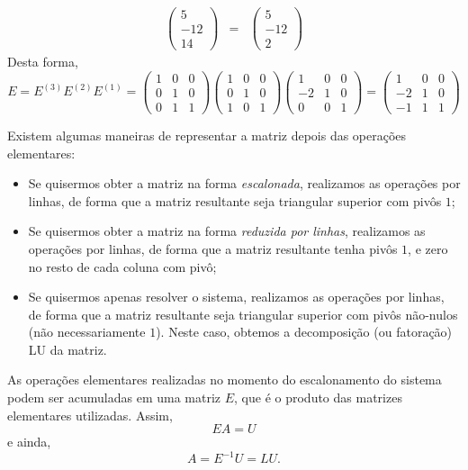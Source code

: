\begin{exemplo*}
\begin{eqnarray*}
		\begin{pmatrix}
			5\\-12\\14
		\end{pmatrix}
		&=&
		\begin{pmatrix}
			5\\-12\\2
		\end{pmatrix}
	\end{eqnarray*}
	Desta forma, 
	\begin{equation*}
	E = E^{(3)}E^{(2)}E^{(1)} = 
	\begin{pmatrix}
		1&0&0\\0&1&0\\0&1&1
	\end{pmatrix}
	\begin{pmatrix}
		1&0&0\\0&1&0\\1&0&1
	\end{pmatrix}
	\begin{pmatrix}
			1&0&0\\-2&1&0\\0&0&1
	\end{pmatrix}
	=
	\begin{pmatrix}
		1&0&0\\
		-2&1&0\\
		-1&1&1
	\end{pmatrix}
	\end{equation*}
\end{exemplo*}

Existem algumas maneiras de representar a matriz depois das operações elementares:
\begin{itemize}
\item Se quisermos obter a matriz na forma \emph{escalonada}, realizamos as operações por linhas, de forma que a matriz resultante seja triangular superior com pivôs $1$;
\item Se quisermos obter a matriz na forma \emph{reduzida por linhas}, realizamos as operações por linhas, de forma que a matriz resultante tenha pivôs $1$, e zero no resto de cada coluna com pivô;
\item Se quisermos apenas resolver o sistema, realizamos as operações por linhas, de forma que a matriz resultante seja triangular superior com pivôs não-nulos (não necessariamente $1$). Neste caso, obtemos a decomposição (ou fatoração) LU da matriz.
\end{itemize}

As operações elementares realizadas no momento do escalonamento do sistema podem ser acumuladas em uma matriz $E$, que é o produto das matrizes elementares utilizadas. Assim,
\begin{equation*}
  EA=U
\end{equation*}
e ainda,
\begin{equation*}
  A = E^{-1}U = LU.
\end{equation*}
	
